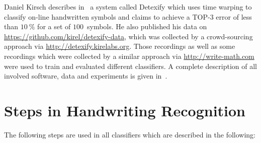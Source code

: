 \documentclass[9pt,technote]{IEEEtran}
\begin{document}
Daniel Kirsch describes in~\cite{Kirsch} a system called Detexify which uses
time warping to classify on-line handwritten symbols and claims to achieve a
TOP-3 error of less than $\SI{10}{\percent}$ for a set of $\num{100}$~symbols.
He also published his data on \url{https://github.com/kirel/detexify-data},
which was collected by a crowd-sourcing approach via
\url{http://detexify.kirelabs.org}. Those recordings as well as some recordings
which were collected by a similar approach via \url{http://write-math.com} were
used to train and evaluated different classifiers. A complete description of
all involved software, data and experiments is given in~\cite{Thoma:2014}.

\section{Steps in Handwriting Recognition}
The following steps are used in all classifiers which are described in the
following:
\end{document}
